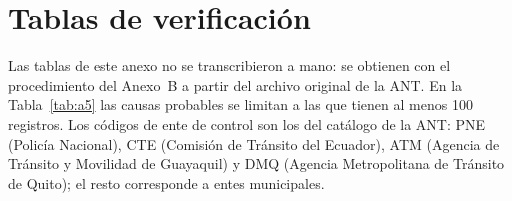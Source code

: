 \section{Tablas de verificación}

Las tablas de este anexo no se transcribieron a mano: se obtienen con el procedimiento del Anexo~B a partir del archivo original de la ANT. En la Tabla~\ref{tab:a5} las causas probables se limitan a las que tienen al menos 100 registros. Los códigos de ente de control son los del catálogo de la ANT: PNE (Policía Nacional), CTE (Comisión de Tránsito del Ecuador), ATM (Agencia de Tránsito y Movilidad de Guayaquil) y DMQ (Agencia Metropolitana de Tránsito de Quito); el resto corresponde a entes municipales.














